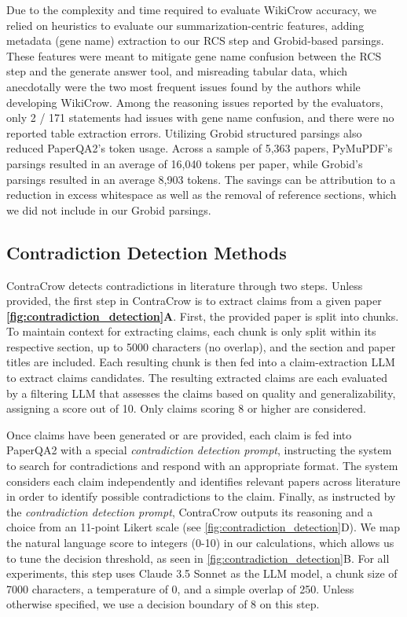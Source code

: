 Due to the complexity and time required to evaluate WikiCrow accuracy, we relied on heuristics to evaluate our summarization-centric features, adding metadata (gene name) extraction to our RCS step and Grobid-based parsings. These features were meant to mitigate gene name confusion between the RCS step and the generate answer tool, and misreading tabular data, which anecdotally were the two most frequent issues found by the authors while developing WikiCrow. Among the reasoning issues reported by the evaluators, only 2 / 171 statements had issues with gene name confusion, and there were no reported table extraction errors. Utilizing Grobid structured parsings also reduced PaperQA2's token usage. Across a sample of 5,363 papers, PyMuPDF's parsings resulted in an average of 16,040 tokens per paper, while Grobid's parsings resulted in an average 8,903 tokens. The savings can be attribution to a reduction in excess whitespace as well as the removal of reference sections, which we did not include in our Grobid parsings.

\subsection{Contradiction Detection Methods}  \label{sec:cc-methods}
ContraCrow detects contradictions in literature through two steps. Unless provided, the first step in ContraCrow is to extract claims from a given paper \textbf{\autoref{fig:contradiction_detection}A}. First, the provided paper is split into chunks. To maintain context for extracting claims, each chunk is only split within its respective section, up to 5000 characters (no overlap), and the section and paper titles are included. Each resulting chunk is then fed into a claim-extraction LLM to extract claims candidates. The resulting extracted claims are each evaluated by a filtering LLM that assesses the claims based on quality and generalizability, assigning a score out of 10. Only claims scoring 8 or higher are considered. 

Once claims have been generated or are provided, each claim is fed into PaperQA2 with a special \textit{contradiction detection prompt}, instructing the system to search for contradictions and respond with an appropriate format. The system considers each claim independently and identifies relevant papers across literature in order to identify possible contradictions to the claim. Finally, as instructed by the \textit{contradiction detection prompt}, ContraCrow outputs its reasoning and a choice from an 11-point Likert scale (see \autoref{fig:contradiction_detection}D). We map the natural language score to integers (0-10) in our calculations, which allows us to tune the decision threshold, as seen in \ref{fig:contradiction_detection}B. For all experiments, this step uses Claude 3.5 Sonnet \cite{claude2024} as the LLM model, a chunk size of 7000 characters, a temperature of 0, and a simple overlap of 250. Unless otherwise specified, we use a decision boundary of $8$ on this step. 

